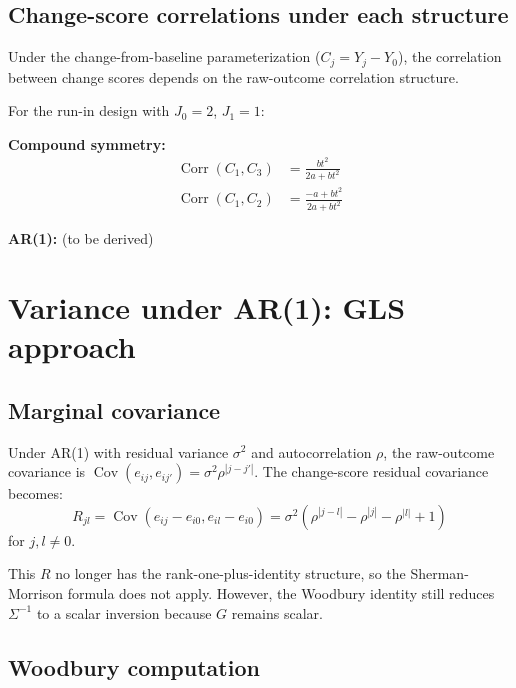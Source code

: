 \documentclass[
  11pt,
]{article}
\begin{document}
\subsection{Change-score correlations under each
structure}\label{change-score-correlations-under-each-structure}

Under the change-from-baseline parameterization (\(C_j = Y_j - Y_0\)),
the correlation between change scores depends on the raw-outcome
correlation structure.

For the run-in design with \(J_0 = 2\), \(J_1 = 1\):

\textbf{Compound symmetry:} \begin{align}
  \mathop{\mathrm{Corr}}(C_1, C_3) &= \frac{bt^2}{2a + bt^2} \\
  \mathop{\mathrm{Corr}}(C_1, C_2) &= \frac{-a + bt^2}{2a + bt^2}
\end{align}

\textbf{AR(1):} (to be derived)

\section{Variance under AR(1): GLS
approach}\label{variance-under-ar1-gls-approach}

\subsection{Marginal covariance}\label{marginal-covariance}

Under AR(1) with residual variance \(\sigma^2\) and autocorrelation
\(\rho\), the raw-outcome covariance is
\(\mathop{\mathrm{Cov}}(e_{ij}, e_{ij'}) = \sigma^2 \rho^{|j-j'|}\). The
change-score residual covariance becomes: \begin{equation}
  R_{jl} = \mathop{\mathrm{Cov}}(e_{ij} - e_{i0}, e_{il} - e_{i0})
  = \sigma^2(\rho^{|j-l|} - \rho^{|j|} - \rho^{|l|} + 1)
\end{equation} for \(j, l \ne 0\).

This \(R\) no longer has the rank-one-plus-identity structure, so the
Sherman-Morrison formula does not apply. However, the Woodbury identity
still reduces \(\Sigma^{-1}\) to a scalar inversion because \(G\)
remains scalar.

\subsection{Woodbury computation}\label{woodbury-computation}
\end{document}
